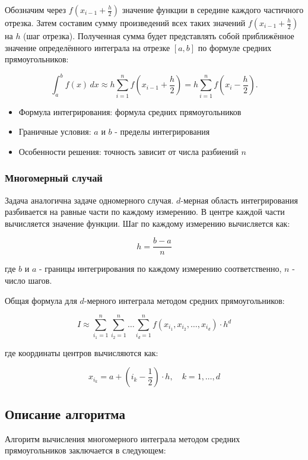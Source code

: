 \documentclass[14pt,a4paper]{article}
\begin{document}
Обозначим через $f\left(x_{i-1} + \frac{h}{2}\right)$ значение функции в середине каждого частичного отрезка. Затем составим сумму произведений всех таких значений $f\left(x_{i-1} + \frac{h}{2}\right)$ на $h$ (шаг отрезка). Полученная сумма будет представлять собой приближённое значение определённого интеграла на отрезке $[a, b]$ по формуле средних прямоугольников:

\[
\int_{a}^{b} f(x) \, dx \approx h \sum_{i=1}^{n} f\left(x_{i-1} + \frac{h}{2}\right) = h \sum_{i=1}^{n} f\left(x_{i} - \frac{h}{2}\right).
\]

\begin{itemize}
\item Формула интегрирования: формула средних прямоугольников
\item Граничные условия: $a$ и $b$ - пределы интегрирования
\item Особенности решения: точность зависит от числа разбиений $n$
\end{itemize}

\subsubsection{Многомерный случай}
Задача аналогична задаче одномерного случая. $d$-мерная область интегрирования разбивается на равные части по каждому измерению. В центре каждой части вычисляется значение функции. Шаг по каждому измерению вычисляется как:

\[ h = \frac{b - a}{n} \]

где $b$ и $a$ - границы интегрирования по каждому измерению соответственно, $n$ - число шагов.

Общая формула для $d$-мерного интеграла методом средних прямоугольников:

\[ I \approx \sum_{i_1=1}^n \sum_{i_2=1}^n \dots \sum_{i_d=1}^n f(x_{i_1}, x_{i_2}, \dots, x_{i_d}) \cdot h^d \]

где координаты центров вычисляются как:

\[ x_{i_k} = a + \left(i_k - \frac{1}{2}\right) \cdot h, \quad k = 1, \dots, d \]

\subsection{Описание алгоритма}
Алгоритм вычисления многомерного интеграла методом средних прямоугольников заключается в следующем:
\end{document}
